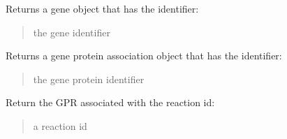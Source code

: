 \documentclass[letterpaper,12pt,english]{sphinxmanual}
\begin{document}
\begin{fulllineitems}
\begin{fulllineitems}
\begin{quote}
\begin{description}
\end{description}\end{quote}

\end{fulllineitems}


\begin{fulllineitems}
\label{\detokenize{api/core:cbmpy.CBModel.Model.getGene}}
\pysigstartsignatures
\pysiglinewithargsret
{}
{}
{}
\pysigstopsignatures
\sphinxAtStartPar
Returns a gene object that has the identifier:
\begin{quote}\begin{description}
\sphinxAtStartPar
{} \textendash{} the gene identifier

\end{description}\end{quote}

\end{fulllineitems}


\begin{fulllineitems}
\label{\detokenize{api/core:cbmpy.CBModel.Model.getGPRassociation}}
\pysigstartsignatures
\pysiglinewithargsret
{}
{}
{}
\pysigstopsignatures
\sphinxAtStartPar
Returns a gene protein association object that has the identifier:
\begin{quote}\begin{description}
\sphinxAtStartPar
{} \textendash{} the gene protein identifier

\end{description}\end{quote}

\end{fulllineitems}


\begin{fulllineitems}
\label{\detokenize{api/core:cbmpy.CBModel.Model.getGPRforReaction}}
\pysigstartsignatures
\pysiglinewithargsret
{}
{}
{}
\pysigstopsignatures
\sphinxAtStartPar
Return the GPR associated with the reaction id:
\begin{quote}\begin{description}
\sphinxAtStartPar
{} \textendash{} a reaction id


\end{description}
\end{quote}
\end{fulllineitems}
\end{fulllineitems}
\end{document}
